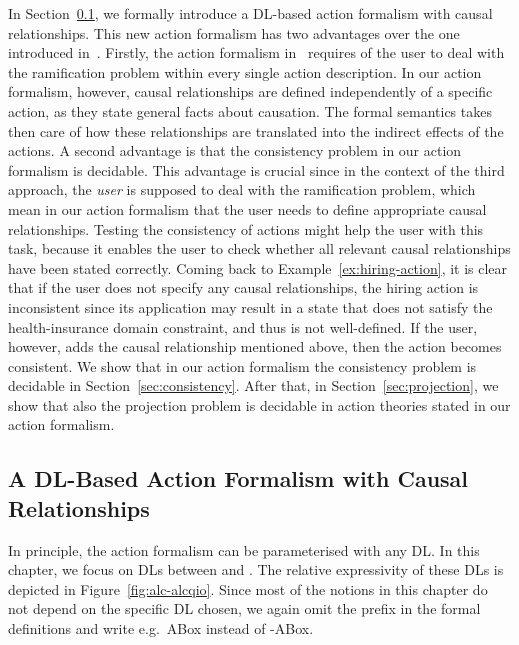 In Section~\ref{sec:causal-relationships}, we formally introduce a DL-based
action formalism with causal relationships.  This new action formalism has two
advantages over the one introduced in~\cite{LLM+-JELIA06}.  Firstly, the action
formalism in~\cite{LLM+-JELIA06} requires of the user to deal with the
ramification problem within every single action description.  In our action
formalism, however, causal relationships are defined independently of a specific
action, as they state general facts about causation.  The formal semantics takes
then care of how these relationships are translated into the indirect effects of
the actions.
%
A second advantage is that the consistency problem in our action formalism is
decidable.  This advantage is crucial since in the context of the third
approach, the \emph{user} is supposed to deal with the ramification problem,
which mean in our action formalism that the user needs to define appropriate
causal relationships.  Testing the consistency of actions might help the user
with this task, because it enables the user to check whether all relevant causal
relationships have been stated correctly.  Coming back to
Example~\ref{ex:hiring-action}, it is clear that if the user does not specify
any causal relationships, the hiring action is inconsistent since its
application may result in a state that does not satisfy the health-insurance
domain constraint, and thus is not well-defined.  If the user, however, adds the
causal relationship mentioned above, then the action becomes consistent.
%
We show that in our action formalism the consistency problem is decidable in
Section~\ref{sec:consistency}.  After that, in Section~\ref{sec:projection}, we
show that also the projection problem is decidable in action theories stated in
our action formalism.


\subsection{A DL-Based Action Formalism with Causal Relationships}\label{sec:causal-relationships}

In principle, the action formalism can be parameterised with any DL\@.  In this
chapter, we focus on DLs between \ALC and \ALCQIO.  The relative expressivity
of these DLs is depicted in Figure~\ref{fig:alc-alcqio}.
%
Since most of the notions in this chapter do not depend on the specific DL
chosen, we again omit the prefix in the formal definitions and write e.g.\ ABox
instead of \ALCQIO-ABox.

